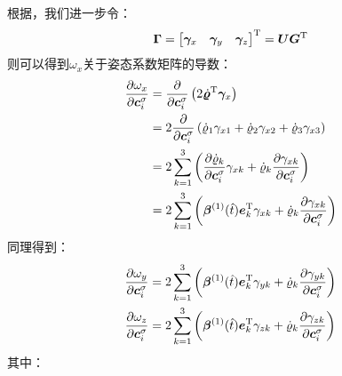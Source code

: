 根据，我们进一步令：
\begin{equation}
    \bm{\Gamma} = 
    \begin{bmatrix}
        \bm{\gamma}_x & \bm{\gamma}_y & \bm{\gamma}_z
    \end{bmatrix}^{\text{T}} = 
    \bm{U}{\bm{G}}^{\text{T}}
    \label{equ:matrix_Gamma}
\end{equation}
则可以得到$\omega_x$关于姿态系数矩阵的导数：
\begin{equation}
    \begin{aligned}
        \frac{\partial{\omega_x}}{\partial{\bm{c}_i^{\sigma}}} &= \frac{\partial}{\partial \bm{c}_i^{\sigma}}\left(2{\dot{\bm{\varrho}}}^{\text{T}}\bm{\gamma}_x\right)\\
        &= 2\frac{\partial}{\partial\bm{c}_i^{\sigma}}\left(\dot{\varrho}_1\gamma_{x1} + \dot{\varrho}_2\gamma_{x2} + \dot{\varrho}_3\gamma_{x3}\right) \\ 
        &= 2\sum_{k=1}^3\left(\frac{\partial{\dot{\varrho}_k}}{\partial{\bm{c}_i^{\sigma}}}\gamma_{xk} + \dot{\varrho}_k\frac{\partial{\gamma_{xk}}}{\partial{\bm{c}_i^{\sigma}}}\right) \\
        &= 2\sum_{k=1}^3\left(\bm{\beta}^{(1)}(\hat{t})\bm{e}_k^{\text{T}}\gamma_{xk} + \dot{\varrho}_k\frac{\partial{\gamma_{xk}}}{\partial{\bm{c}_i^{\sigma}}}\right)
    \end{aligned}
    \label{equ:omegax_d_cis}
\end{equation}
同理得到：
\begin{align}
    \frac{\partial{\omega_y}}{\partial{\bm{c}_i^{\sigma}}} &= 
    2\sum_{k=1}^3\left(\bm{\beta}^{(1)}(\hat{t})\bm{e}_k^{\text{T}}\gamma_{yk} + \dot{\varrho}_k\frac{\partial{\gamma_{yk}}}{\partial{\bm{c}_i^{\sigma}}}\right) \label{equ:omegay_d_cis}\\
    \frac{\partial{\omega_z}}{\partial{\bm{c}_i^{\sigma}}} &= 
    2\sum_{k=1}^3\left(\bm{\beta}^{(1)}(\hat{t})\bm{e}_k^{\text{T}}\gamma_{zk} + \dot{\varrho}_k\frac{\partial{\gamma_{zk}}}{\partial{\bm{c}_i^{\sigma}}}\right) \label{equ:omegaz_d_cis}
\end{align}
其中：
